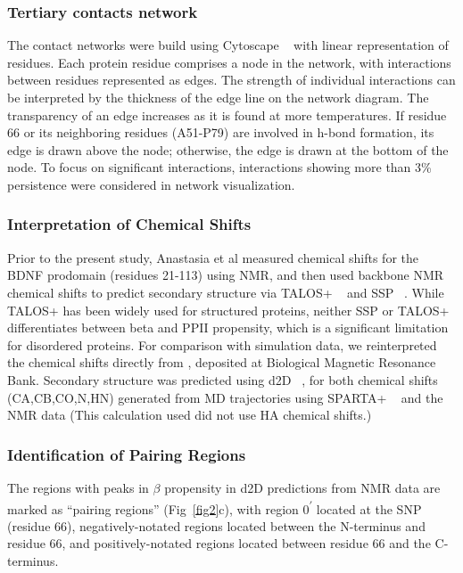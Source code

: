 \documentclass[10pt,letterpaper]{article}
\begin{document}
\subsubsection*{Tertiary contacts network} The contact networks were build using Cytoscape ~\cite {Ahlstrom2013} with linear representation of residues.  Each protein residue comprises a node in the network, with interactions between residues represented as edges. The strength of individual interactions can be interpreted by the  thickness of the edge line on the network diagram. The transparency of an edge increases as it is found at more temperatures.  If residue  66 or its neighboring residues (A51-P79) are involved in h-bond formation, its edge is drawn above the node; otherwise, the edge is drawn at the bottom of the node. To focus on significant interactions, interactions showing more than 3\% persistence were considered in network visualization.      

\subsubsection*{Interpretation of Chemical Shifts}  Prior to the present study, Anastasia et al\cite{Anastasia2013} measured chemical shifts for the BDNF prodomain (residues 21-113) using NMR, and then used backbone NMR chemical shifts to predict secondary structure via TALOS+ ~\cite{Shen2009} and SSP ~\cite{Marsh2006a}. While TALOS+ has been widely used for structured proteins, neither SSP or TALOS+ differentiates between beta and PPII propensity, which is a significant limitation for disordered proteins.  For comparison with simulation data, we reinterpreted the chemical shifts directly from \cite{Anastasia2013}, deposited at Biological Magnetic Resonance Bank. Secondary structure was predicted using d2D ~\cite{Sormanni2015}, for both chemical shifts (CA,CB,CO,N,HN) generated from MD trajectories using SPARTA+ ~\cite{Shen2010} and the NMR data (This calculation used did not use HA chemical shifts.)  

\subsubsection*{Identification of Pairing Regions} The regions with peaks in $\beta$ propensity in d2D predictions from NMR data are marked as ``pairing regions'' (Fig~\ref{fig2}c), with region 0\textsuperscript{$\prime$} located at the SNP (residue 66), negatively-notated regions located between the N-terminus and residue 66, and positively-notated regions located between residue 66 and the C-terminus.  
\end{document}
